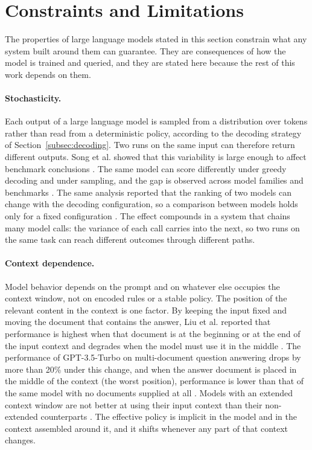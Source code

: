\section{Constraints and Limitations}
\label{sec:properties}

The properties of large language models stated in this section constrain what any system built around them can guarantee. They are consequences of how the model is trained and queried, and they are stated here because the rest of this work depends on them.

\paragraph{Stochasticity.} Each output of a large language model is sampled from a distribution over tokens rather than read from a deterministic policy, according to the decoding strategy of Section~\ref{subsec:decoding}. Two runs on the same input can therefore return different outputs. Song et al. showed that this variability is large enough to affect benchmark conclusions \cite{songGoodBadGreedy2024}. The same model can score differently under greedy decoding and under sampling, and the gap is observed across model families and benchmarks \cite{songGoodBadGreedy2024}. The same analysis reported that the ranking of two models can change with the decoding configuration, so a comparison between models holds only for a fixed configuration \cite{songGoodBadGreedy2024}. The effect compounds in a system that chains many model calls: the variance of each call carries into the next, so two runs on the same task can reach different outcomes through different paths.

\paragraph{Context dependence.} Model behavior depends on the prompt and on whatever else occupies the context window, not on encoded rules or a stable policy. The position of the relevant content in the context is one factor. By keeping the input fixed and moving the document that contains the answer, Liu et al. reported that performance is highest when that document is at the beginning or at the end of the input context and degrades when the model must use it in the middle \cite{liuLostMiddleHow2023a}. The performance of GPT-3.5-Turbo on multi-document question answering drops by more than 20\% under this change, and when the answer document is placed in the middle of the context (the worst position), performance is lower than that of the same model with no documents supplied at all \cite{liuLostMiddleHow2023a}. Models with an extended context window are not better at using their input context than their non-extended counterparts \cite{liuLostMiddleHow2023a}. The effective policy is implicit in the model and in the context assembled around it, and it shifts whenever any part of that context changes.

